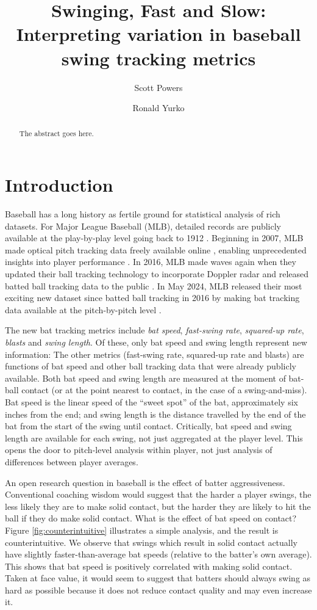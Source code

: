 \documentclass{article}
\title{Swinging, Fast and Slow:\\Interpreting variation in baseball swing tracking metrics}
\author[1]{Scott Powers}
\author[2]{Ronald Yurko}
\affil[1]{Department of Sport Management, Rice University}
\affil[2]{Department of Statistics \& Data Science, Carnegie Mellon University}
\begin{document}
  \maketitle
	
  \begin{abstract}
    The abstract goes here.
  \end{abstract}

  \section{Introduction}
  \label{sec:introduction}

    Baseball has a long history as fertile ground for statistical analysis of rich datasets. For Major League Baseball (MLB), detailed records are publicly available at the play-by-play level going back to 1912 \citep{retrosheet}. Beginning in 2007, MLB made optical pitch tracking data freely available online
    \citep{fast_what_2010}, enabling unprecedented insights into player performance \citep{swartz_quality_2017}. In 2016, MLB made waves again when they updated their ball tracking technology to incorporate Doppler radar and released batted ball tracking data to the public \citep{arthur_new_2016}. In May 2024, MLB released their most exciting new dataset since batted ball tracking in 2016 by making bat tracking data available at the pitch-by-pitch level \citep{petriello_everything_2024}.

    The new bat tracking metrics include {\it bat speed}, {\it fast-swing rate}, {\it squared-up rate}, {\it blasts} and {\it swing length}. Of these, only bat speed and swing length represent new information: The other metrics (fast-swing rate, squared-up rate and blasts) are functions of bat speed and other ball tracking data that were already publicly available. Both bat speed and swing length are measured at the moment of bat-ball contact (or at the point nearest to contact, in the case of a swing-and-miss). Bat speed is the linear speed of the ``sweet spot'' of the bat, approximately six inches from the end; and swing length is the distance travelled by the end of the bat from the start of the swing until contact. Critically, bat speed and swing length are available for each swing, not just aggregated at the player level. This opens the door to pitch-level analysis within player, not just analysis of differences between player averages.

    An open research question in baseball is the effect of batter aggressiveness. Conventional coaching wisdom would suggest that the harder a player swings, the less likely they are to make solid contact, but the harder they are likely to hit the ball if they do make solid contact. What is the effect of bat speed on contact? Figure \ref{fig:counterintuitive} illustrates a simple analysis, and the result is counterintuitive. We observe that swings which result in solid contact actually have slightly faster-than-average bat speeds (relative to the batter's own average). This shows that bat speed is positively correlated with making solid contact. Taken at face value, it would seem to suggest that batters should always swing as hard as possible because it does not reduce contact quality and may even increase it.
\end{document}
